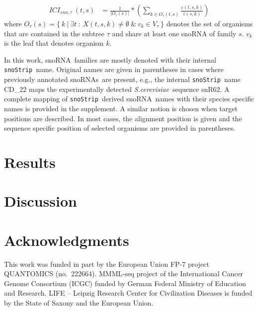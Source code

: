 \documentclass[preprint,3p,times,twocolumn]{elsarticle}
\newcommand{\snos}{snoRNAs}
\newcommand{\sno}{snoRNA}
\newcommand{\snostrip}{\texttt{snoStrip}}
\newcommand{\sce}{\emph{S.cerevisiae}}
\begin{document}
\begin{equation}
  \begin{split}
    ICI_{sno,\tau}\:(t,s) & = \frac{1}{|O_\tau(s)|} * \left( \sum_{k\in O_\tau(t,s)} \frac{\varepsilon(t,s,k)}{\hat\varepsilon(s,k)} \right)
  \end{split}
\end{equation}
where
$O_\tau(s) = \{\ k\ |\ \exists t\ :\ X(t,s,k) \ne \emptyset\ \&\ v_k
\in V_\tau\ \}$ denotes the set of organisms that are contained in the
subtree $\tau$ and share at least one snoRNA of family $s$. $v_k$ is
the leaf that denotes organism $k$.

\vspace{5mm}
\par
In this work, \sno\ families are mostly denoted with their internal
\snostrip\ name. Original names are given in parentheses in cases
where previously annotated \snos\ are present, e.g., the internal
\snostrip\ name CD\_22 maps the experimentally detected \sce\ sequence
snR62. A complete mapping of \snostrip\ derived \sno\ names with their
species specific names is provided in the supplement.  A similar
notion is chosen when target positions are described. In most cases,
the alignment position is given and the sequence specific position of
selected organisms are provided in parentheses.


\section{Results}


\section{Discussion}



\section*{Acknowledgments}

This work was funded in part by the European Union FP-7 project
QUANTOMICS (no.\ 222664). MMML-seq project of the International Cancer
Genome Consortium (ICGC) funded by German Federal Ministry of
Education and Research.  LIFE -- Leipzig Research Center for
Civilization Diseases is funded by the State of Saxony and the
European Union.
\end{document}
